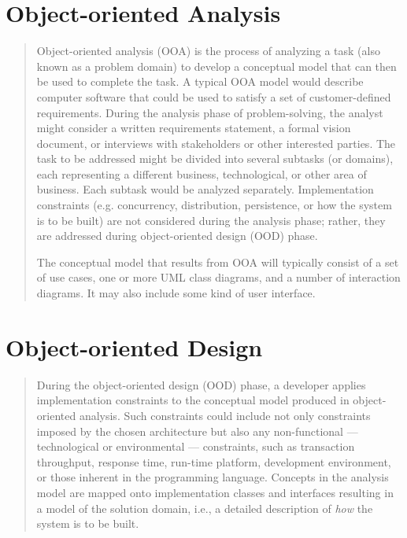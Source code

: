 \documentclass [11pt]{book}
\begin{document}
\section{Object-oriented Analysis}

\label{sec:object-orientedanalysis}



\begin{quote}


Object-oriented analysis (OOA) is the process of analyzing
       a task (also known as a problem domain) to develop a conceptual
       model that can then be used to complete the task. A typical OOA
       model would describe computer software that could be used to
       satisfy a set of customer-defined requirements. During the
       analysis phase of problem-solving, the analyst might consider a
       written requirements statement, a formal vision document, or
       interviews with stakeholders or other interested parties. The
       task to be addressed might be divided into several subtasks (or
       domains), each representing a different business,
       technological, or other area of business. Each subtask would be
       analyzed separately. Implementation
       constraints (e.g. concurrency, distribution, persistence, or
       how the system is to be built) are not considered during the
       analysis phase; rather, they are addressed during
       object-oriented design (OOD) phase.



The conceptual model that results from OOA will typically consist of a
set of use cases, one or more UML class diagrams, and a number of
interaction diagrams. It may also include some kind of user interface.



\end{quote}


\section{Object-oriented Design}

\label{sec:object-orienteddesign}



\begin{quote}
During the object-oriented design (OOD) phase, a developer
applies implementation constraints to the conceptual model produced in
object-oriented analysis. Such constraints could include not only
constraints imposed by the chosen architecture but also any
non-functional --- technological or environmental --- constraints,
such as transaction throughput, response time, run-time platform,
development environment, or those inherent in the programming
language. Concepts in the analysis model are mapped onto
implementation classes and interfaces resulting in a model of the
solution domain, i.e., a detailed description of \emph{how} the system is to be built.

\end{quote}
\end{document}
